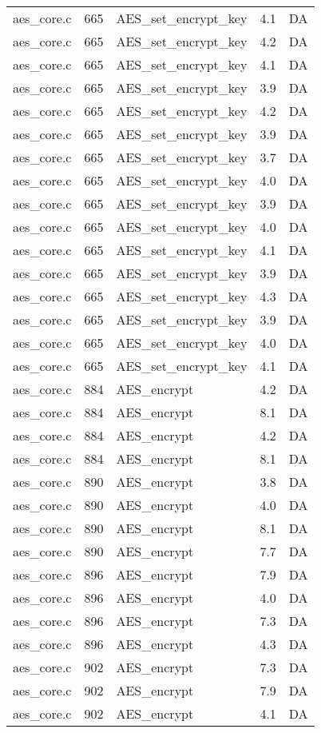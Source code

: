 \begin{table}[!ht]
\begin{tabular}{lrlrr}
aes\_core.c& 665&AES\_set\_encrypt\_key&4.1 &DA\\
aes\_core.c& 665&AES\_set\_encrypt\_key&4.2 &DA\\
aes\_core.c& 665&AES\_set\_encrypt\_key&4.1 &DA\\
aes\_core.c& 665&AES\_set\_encrypt\_key&3.9 &DA\\
aes\_core.c& 665&AES\_set\_encrypt\_key&4.2 &DA\\
aes\_core.c& 665&AES\_set\_encrypt\_key&3.9 &DA\\
aes\_core.c& 665&AES\_set\_encrypt\_key&3.7 &DA\\
aes\_core.c& 665&AES\_set\_encrypt\_key&4.0 &DA\\
aes\_core.c& 665&AES\_set\_encrypt\_key&3.9 &DA\\
aes\_core.c& 665&AES\_set\_encrypt\_key&4.0 &DA\\
aes\_core.c& 665&AES\_set\_encrypt\_key&4.1 &DA\\
aes\_core.c& 665&AES\_set\_encrypt\_key&3.9 &DA\\
aes\_core.c& 665&AES\_set\_encrypt\_key&4.3 &DA\\
aes\_core.c& 665&AES\_set\_encrypt\_key&3.9 &DA\\
aes\_core.c& 665&AES\_set\_encrypt\_key&4.0 &DA\\
aes\_core.c& 665&AES\_set\_encrypt\_key&4.1 &DA\\
aes\_core.c& 884&AES\_encrypt&4.2 &DA\\
aes\_core.c& 884&AES\_encrypt&8.1 &DA\\
aes\_core.c& 884&AES\_encrypt&4.2 &DA\\
aes\_core.c& 884&AES\_encrypt&8.1 &DA\\
aes\_core.c& 890&AES\_encrypt&3.8 &DA\\
aes\_core.c& 890&AES\_encrypt&4.0 &DA\\
aes\_core.c& 890&AES\_encrypt&8.1 &DA\\
aes\_core.c& 890&AES\_encrypt&7.7 &DA\\
aes\_core.c& 896&AES\_encrypt&7.9 &DA\\
aes\_core.c& 896&AES\_encrypt&4.0 &DA\\
aes\_core.c& 896&AES\_encrypt&7.3 &DA\\
aes\_core.c& 896&AES\_encrypt&4.3 &DA\\
aes\_core.c& 902&AES\_encrypt&7.3 &DA\\
aes\_core.c& 902&AES\_encrypt&7.9 &DA\\
aes\_core.c& 902&AES\_encrypt&4.1 &DA\\

\end{tabular}
\end{table}
